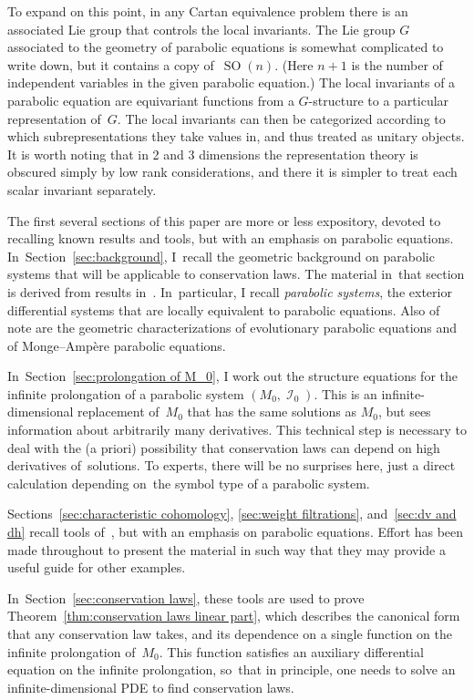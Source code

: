 \documentclass[10pt,a4paper]{amsart}
\DeclareMathOperator{\SO}{SO}
\DeclareMathOperator{\I}{\mathcal{I}}
\numberwithin{equation}{section}
\begin{document}
To expand on this point, in any Cartan equivalence problem there is an associated Lie group that controls the local invariants.
The Lie group $ G $ associated to the geometry of parabolic equations is somewhat complicated to write down, but it contains a copy of~$\SO(n)$.
(Here $n+1$ is the number of independent variables in the given parabolic equation.)
The local invariants of a parabolic equation are equivariant functions from a $ G $-structure to a particular representation of~$ G $.
The local invariants can then be categorized according to which subrepresentations they take values in, and thus treated as unitary objects.
It is worth noting that in 2 and 3 dimensions the representation theory is obscured simply by low rank considerations, and there it is simpler to treat each scalar invariant separately.

 The first several sections of this paper are more or less expository, devoted to recalling known results and tools, but with an emphasis on parabolic equations. In~Section~\ref{sec:background}, I~recall the geometric background on parabolic systems that will be applicable to conservation laws. The material in~that section is derived from results in~\cite{McMillan:ParabolicsI}. In~particular, I recall \emph{parabolic systems}, the exterior differential systems that are locally equivalent to parabolic equations.
Also of note are the geometric characterizations of evolutionary parabolic equations and of Monge--Amp\`ere parabolic equations.

In~Section~\ref{sec:prolongation of M_0}, I work out the structure equations for the infinite prolongation of a parabolic system $(M_0,\I_0)$. This is an infinite-dimensional replacement of~$M_0$ that has the same solutions as $M_0$, but sees information about arbitrarily many derivatives. This technical step is necessary to deal with the (a priori) possibility that conservation laws can depend on high derivatives of~solutions. To experts, there will be no surprises here, just a direct calculation depending on~the symbol type of a parabolic system.

Sections~\ref{sec:characteristic cohomology}, \ref{sec:weight filtrations}, and~\ref{sec:dv and dh} recall tools of~\cite{Characteristic_Cohomology_I}, but with an emphasis on parabolic equations.
Effort has been made throughout to present the material in such way that they may provide a useful guide for other examples.

In~Section~\ref{sec:conservation laws}, these tools are used to prove Theorem~\ref{thm:conservation laws linear part}, which describes the canonical form that any conservation law takes, and its dependence on a single function on the infinite prolongation of~$M_0$. This function satisfies an auxiliary differential equation on the infinite prolongation, so~that in principle, one needs to solve an infinite-dimensional PDE to find conservation laws.
\end{document}
